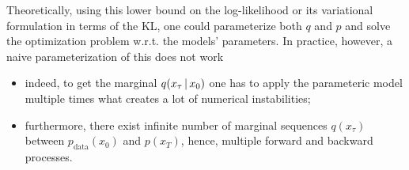 Theoretically, using this lower bound on the log-likelihood or its variational formulation in terms of the KL, one could parameterize both $q$ and $p$ and solve the optimization problem w.r.t. the models' parameters. In practice, however, a naive parameterization of this does not work
\begin{itemize}[label={}]
    \item \no indeed, to get the marginal $q(x_\tau \,|\, x_0)$ one has to apply the parameteric model multiple times what creates a lot of numerical instabilities;
    \item \no furthermore, there exist infinite number of marginal sequences $q(x_\tau)$ between $p_{\text{data}}(x_0)$ and $p(x_T)$, hence, multiple forward and backward processes.
\end{itemize}


